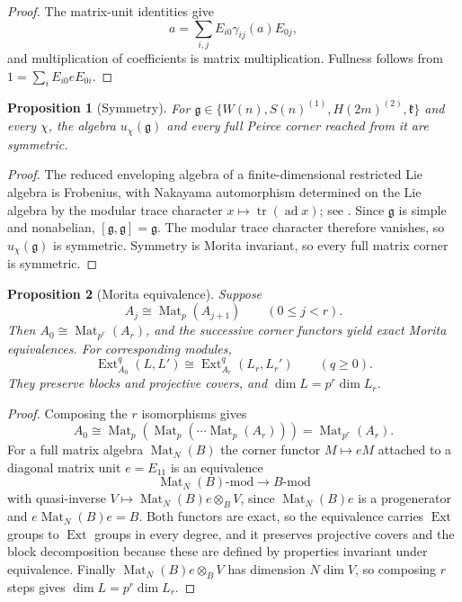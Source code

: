 \documentclass[11pt,reqno]{amsart}
\newtheorem{proposition}[proposition]{Proposition}
\theoremstyle{definition}
\theoremstyle{remark}
\theoremstyle{definition}
\newcommand{\kk}{\mathfrak{k}}
\newcommand{\Mat}{\operatorname{Mat}}
\newcommand{\Ext}{\operatorname{Ext}}
\newcommand{\ad}{\operatorname{ad}}
\begin{document}
\begin{proof}
The matrix-unit identities give
\[
 a=\sum_{i,j}E_{i0}\gamma_{ij}(a)E_{0j},
\]
and multiplication of coefficients is matrix multiplication.  Fullness
follows from $1=\sum_iE_{i0}eE_{0i}$.
\end{proof}

\begin{proposition}[Symmetry]\label{prop:symmetric}\label{prop:symmetric-general}
For $\mathfrak g\in\{W(n),S(n)^{(1)},H(2m)^{(2)},\kk\}$ and every
$\chi$, the algebra $u_\chi(\mathfrak g)$ and every full Peirce corner
reached from it are symmetric.
\end{proposition}

\begin{proof}
The reduced enveloping algebra of a finite-dimensional restricted Lie algebra
is Frobenius, with Nakayama automorphism determined on the Lie algebra by the
modular trace character $x\mapsto\operatorname{tr}(\ad x)$; see
\cite[Chapter~V, Section~4]{StradeFarnsteiner1988}.  Since $\mathfrak g$ is simple and nonabelian,
$[\mathfrak g,\mathfrak g]=\mathfrak g$. The modular trace character
therefore vanishes, so $u_\chi(\mathfrak g)$ is symmetric.  Symmetry is Morita invariant, so every full matrix
corner is symmetric.
\end{proof}

\begin{proposition}[Morita equivalence]\label{prop:morita-transport}
Suppose
\[
 A_j\cong\Mat_p(A_{j+1})\qquad(0\le j<r).
\]
Then $A_0\cong\Mat_{p^r}(A_r)$, and the successive corner functors yield
exact Morita equivalences.  For
corresponding modules,
\[
 \Ext_{A_0}^q(L,L')\cong\Ext_{A_r}^q(L_r,L_r')
 \qquad(q\ge0).
\]
They preserve blocks and projective covers, and
$\dim L=p^r\dim L_r$.
\end{proposition}

\begin{proof}
Composing the $r$ isomorphisms gives
\[
 A_0\cong\Mat_p(\Mat_p(\cdots\Mat_p(A_r)))=\Mat_{p^r}(A_r).
\]
For a full
matrix algebra $\Mat_N(B)$ the corner functor $M\mapsto eM$ attached to a
diagonal matrix unit $e=E_{11}$ is an equivalence
\[
 \Mat_N(B)\text{-mod}\longrightarrow B\text{-mod}
\]
with quasi-inverse $V\mapsto\Mat_N(B)e\otimes_BV$, since
$\Mat_N(B)e$ is a progenerator and $e\Mat_N(B)e=B$.  Both functors are exact, so the equivalence carries
$\Ext$ groups to $\Ext$ groups in every degree, and it preserves projective
covers and the block decomposition because these are defined by properties
invariant under equivalence.  Finally $\Mat_N(B)e\otimes_BV$ has dimension
$N\dim V$, so composing $r$ steps gives $\dim L=p^r\dim L_r$.
\end{proof}
\end{document}
